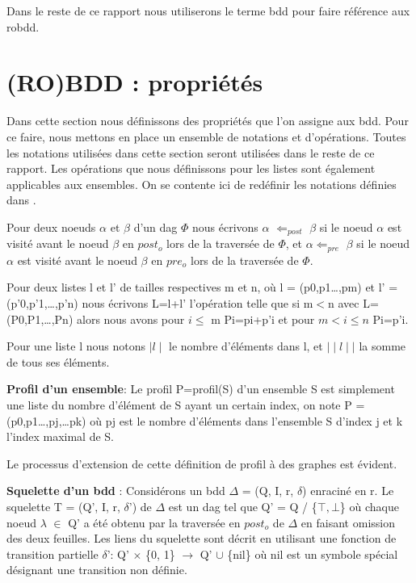 \documentclass[french]{article}
\begin{document}
Dans le reste de ce rapport nous utiliserons le terme bdd pour faire référence aux robdd.
\newpage
\section{(RO)BDD : propriétés}
Dans cette section nous définissons des propriétés que l'on assigne aux bdd. Pour ce faire, nous mettons en place un ensemble de notations et d'opérations. Toutes les notations utilisées dans cette section seront utilisées dans le reste de ce rapport. Les opérations que nous définissons pour les listes sont également applicables aux ensembles. On se contente ici de redéfinir les notations définies dans \cite{genitrini}.
\vspace{5mm} 

Pour deux noeuds \(\alpha\) et \(\beta\) d'un dag \(\Phi\) nous écrivons \(\alpha\) \(\Leftarrow_{post}\) \(\beta\) si le noeud \(\alpha\) est visité avant le noeud \(\beta\) en \(post_{o}\) lors de la traversée de \(\Phi\), et \(\alpha\)\(\Leftarrow_{pre}\) \(\beta\) si le noeud \(\alpha\) est visité avant le noeud \(\beta\) en \(pre_{o}\) lors de la traversée de \(\Phi\).
\vspace{5mm} 

Pour deux listes l et l’ de tailles respectives m et n, où l = (p0,p1…,pm) et l’ = (p’0,p’1,…,p’n) nous écrivons L=l+l’ l'opération telle que si m\(<\)n avec L=(P0,P1,…,Pn) alors nous avons pour \(i\leq\) m Pi=pi+p’i et pour \(m<i\leq n\) Pi=p’i.

Pour une liste l nous notons \(\mid l\mid \) le nombre d'éléments dans l, et \(\mid\mid l\mid\mid\) la somme de tous ses éléments.
\vspace{5mm} 

\textbf{Profil d'un ensemble}: Le profil P=profil(S) d'un ensemble S est simplement une liste du nombre d'élément de S ayant un certain index, on note P = (p0,p1…,pj,…pk) où pj est le nombre d'éléments dans l'ensemble S d'index j et k l'index maximal de S. 

Le processus d'extension de cette définition de profil à des graphes est évident.
\vspace{5mm} 

\textbf{Squelette d'un bdd} : Considérons un bdd \(\Delta\) = (Q, I, r, \(\delta\)) enraciné en r. Le squelette T = (Q’, I, r, \(\delta\)’) de \(\Delta\) est un dag tel que Q’ = Q / \{\(\top,\bot\)\} où chaque noeud \(\lambda\) \(\in\) Q’ a été obtenu par la traversée en \(post_{o}\) de \(\Delta\) en faisant omission des deux feuilles. Les liens du squelette sont décrit en utilisant une fonction de transition partielle \(\delta\)’: Q’ \(\times\) \{0, 1\} \(\rightarrow\) Q' \(\cup\) \{nil\} où nil est un symbole spécial désignant une transition non définie.
\end{document}

